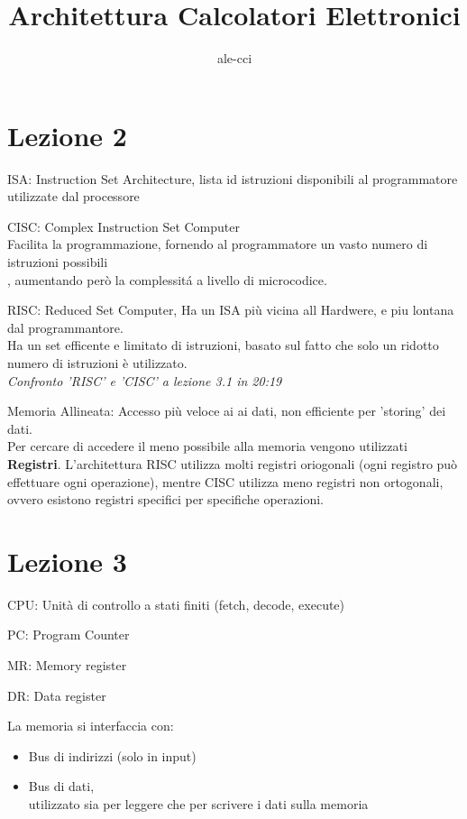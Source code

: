 \documentclass[a4paper,10pt]{article}
\title{Architettura Calcolatori Elettronici}
\author{ale-cci}
\begin{document}
\maketitle{}


\section{Lezione 2}
ISA: Instruction Set Architecture, lista id istruzioni disponibili al programmatore utilizzate dal processore

CISC: Complex Instruction Set Computer
\\
Facilita la programmazione, fornendo al programmatore un vasto numero di istruzioni possibili\\
, aumentando però la complessitá a livello di microcodice.


RISC: Reduced Set Computer, Ha un ISA più vicina all Hardwere, e piu lontana dal programmantore.
\\
Ha un set efficente e limitato di istruzioni, basato sul fatto che solo un ridotto numero di istruzioni è utilizzato.
\\
\textit{Confronto 'RISC' e 'CISC' a lezione 3.1 in 20:19}

Memoria Allineata: Accesso più veloce ai ai dati, non efficiente per 'storing' dei dati.
\\
Per cercare di accedere il meno possibile alla memoria vengono utilizzati \textbf{Registri}.
L'architettura RISC utilizza molti registri oriogonali (ogni registro può effettuare ogni operazione),
mentre CISC utilizza meno registri non ortogonali, ovvero esistono registri specifici per specifiche operazioni.
\section{Lezione 3}
CPU: Unità di controllo a stati finiti (fetch, decode, execute)

PC: Program Counter

MR: Memory register

DR: Data register

La memoria si interfaccia con:
\begin{itemize}
    \item Bus di indirizzi (solo in input)
    \item Bus di dati, \\utilizzato sia per leggere che per scrivere i dati sulla memoria
\end{itemize}
\end{document}
